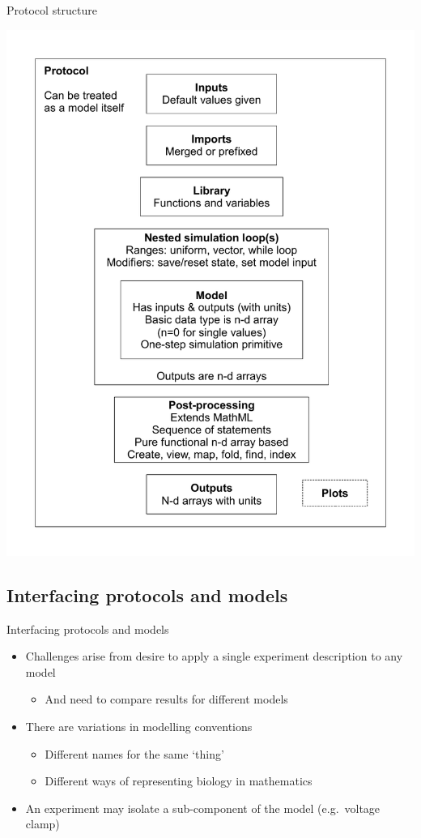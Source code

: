 \documentclass[t,xcolor={usenames,dvipsnames}]{beamer}
\newcommand{\subitem}[1]{\begin{itemize}[<.->]\item #1 \end{itemize}}
\begin{document}
\begin{frame}{Protocol structure}
\begin{center}
\vspace{-.5cm}
\includegraphics[height=.9\textheight]{proto_diag}
\end{center}
\end{frame}

\subsection{Interfacing protocols and models}

\begin{frame}{Interfacing protocols and models}
\begin{itemize}
\item Challenges arise from desire to apply a single experiment description to any model
  \subitem{And need to compare results for different models}
\item There are variations in modelling conventions
  \begin{itemize}
  \item Different names for the same `thing'
  \item Different ways of representing biology in mathematics
  \end{itemize}
\item An experiment may isolate a sub-component of the model (e.g.\ voltage clamp)
\end{itemize}
\end{frame}
\end{document}
